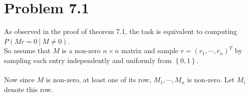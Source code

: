 \section*{Problem 7.1}
As observed in the proof of theorem 7.1, the task is equivalent to
computing $P(Mr=0 \ | \ M \neq 0)$. \\
So assume that $M$ is a non-zero $n \times n$ matrix and sample $r=(r_1,\cdots,r_n)^T$
by sampling each entry independently and uniformly from $\left\{ 0,1 \right\}$. \\ \\
Now since $M$ is non-zero, at least one of its row, $M_1,\cdots,M_n$ is non-zero.
Let $M_i$ denote this row.
